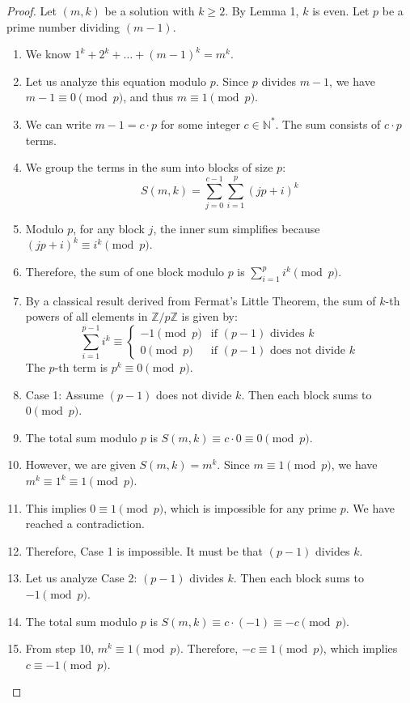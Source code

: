 \documentclass[11pt,a4paper]{article}
\begin{document}
\begin{proof}
Let $(m, k)$ be a solution with $k \ge 2$. By Lemma 1, $k$ is even. Let $p$ be a prime number dividing $(m-1)$.
\begin{enumerate}
    \item We know $1^k + 2^k + \dots + (m-1)^k = m^k$.
    \item Let us analyze this equation modulo $p$. Since $p$ divides $m-1$, we have $m-1 \equiv 0 \pmod p$, and thus $m \equiv 1 \pmod p$.
    \item We can write $m-1 = c \cdot p$ for some integer $c \in \mathbb{N}^*$. The sum consists of $c \cdot p$ terms.
    \item We group the terms in the sum into blocks of size $p$:
    $$S(m, k) = \sum_{j=0}^{c-1} \sum_{i=1}^{p} (jp + i)^k$$
    \item Modulo $p$, for any block $j$, the inner sum simplifies because $(jp + i)^k \equiv i^k \pmod p$.
    \item Therefore, the sum of one block modulo $p$ is $\sum_{i=1}^{p} i^k \pmod p$.
    \item By a classical result derived from Fermat's Little Theorem, the sum of $k$-th powers of all elements in $\mathbb{Z}/p\mathbb{Z}$ is given by:
    $$\sum_{i=1}^{p-1} i^k \equiv \begin{cases} -1 \pmod p & \text{if } (p-1) \text{ divides } k \\ 0 \pmod p & \text{if } (p-1) \text{ does not divide } k \end{cases}$$
    The $p$-th term is $p^k \equiv 0 \pmod p$.
    \item Case 1: Assume $(p-1)$ does not divide $k$. Then each block sums to $0 \pmod p$.
    \item The total sum modulo $p$ is $S(m, k) \equiv c \cdot 0 \equiv 0 \pmod p$.
    \item However, we are given $S(m, k) = m^k$. Since $m \equiv 1 \pmod p$, we have $m^k \equiv 1^k \equiv 1 \pmod p$.
    \item This implies $0 \equiv 1 \pmod p$, which is impossible for any prime $p$. We have reached a contradiction.
    \item Therefore, Case 1 is impossible. It must be that $(p-1)$ divides $k$.
    \item Let us analyze Case 2: $(p-1)$ divides $k$. Then each block sums to $-1 \pmod p$.
    \item The total sum modulo $p$ is $S(m, k) \equiv c \cdot (-1) \equiv -c \pmod p$.
    \item From step 10, $m^k \equiv 1 \pmod p$. Therefore, $-c \equiv 1 \pmod p$, which implies $c \equiv -1 \pmod p$.

\end{enumerate}
\end{proof}
\end{document}
